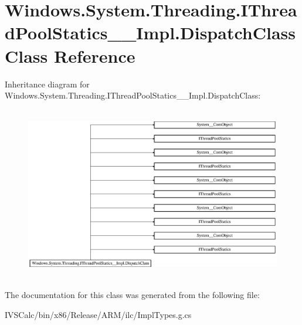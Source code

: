 \hypertarget{class_windows_1_1_system_1_1_threading_1_1_i_thread_pool_statics_____impl_1_1_dispatch_class}{}\section{Windows.\+System.\+Threading.\+I\+Thread\+Pool\+Statics\+\_\+\+\_\+\+Impl.\+Dispatch\+Class Class Reference}
\label{class_windows_1_1_system_1_1_threading_1_1_i_thread_pool_statics_____impl_1_1_dispatch_class}
Inheritance diagram for Windows.\+System.\+Threading.\+I\+Thread\+Pool\+Statics\+\_\+\+\_\+\+Impl.\+Dispatch\+Class\+:\begin{figure}[H]
\begin{center}
\leavevmode
\includegraphics[height=7.623762cm]{class_windows_1_1_system_1_1_threading_1_1_i_thread_pool_statics_____impl_1_1_dispatch_class}
\end{center}
\end{figure}


The documentation for this class was generated from the following file\+:\begin{DoxyCompactItemize}
\item 
I\+V\+S\+Calc/bin/x86/\+Release/\+A\+R\+M/ilc/Impl\+Types.\+g.\+cs\end{DoxyCompactItemize}
